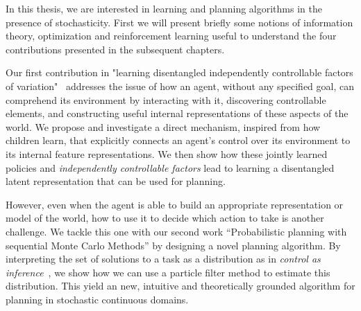 In this thesis, we are interested in learning and planning algorithms in the presence of stochasticity. First we will present briefly some notions of information theory, optimization and reinforcement learning useful to understand the four contributions presented in the subsequent chapters.%

Our first contribution in "learning disentangled independently controllable factors of variation"~\citep{bengio2017independently, thomas2017independently, thomas2018disentangling} addresses the issue of how an agent, without any specified goal, can comprehend its environment by interacting with it, discovering controllable elements, and constructing useful internal representations of these aspects of the world. We propose and investigate a direct mechanism, inspired from how children learn, that explicitly connects an agent's control over its environment to its internal feature representations. We then show how these jointly learned policies and \emph{independently controllable factors} lead to learning a disentangled latent representation that can be used for planning. 



However, even when the agent is able to build an appropriate representation or model of the world, how to use it to decide which action to take is another challenge.
We tackle this one with our second work ``Probabilistic planning with sequential Monte Carlo Methods'' by designing a novel planning algorithm. By interpreting the set of solutions to a task as a distribution as in \textit{control as inference}~\citep{toussaint2006probabilistic, toussaint2009robot, levine2018reinforcement}, we show how we can use a particle filter method to estimate this distribution. This yield an new, intuitive and theoretically grounded algorithm for planning in stochastic continuous domains.

